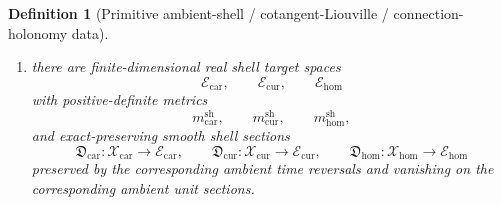 \documentclass[11pt]{article}
\newcommand{\TensorAmbientSpace}{\mathcal X_{\mathrm{car}}}
\newcommand{\CurAmbientSpace}{\mathcal X_{\mathrm{cur}}}
\newcommand{\HomAmbientSpace}{\mathcal X_{\mathrm{hom}}}
\newcommand{\TensorAmbientRead}{\Pi_{\mathrm{car}}^{\mathrm{amb}}}
\newcommand{\CurAmbientRead}{\Pi_{\mathrm{cur}}^{\mathrm{amb}}}
\newcommand{\HomAmbientRead}{\Pi_{\mathrm{hom}}^{\mathrm{amb}}}
\newcommand{\TensorShellTarget}{\mathcal E_{\mathrm{car}}}
\newcommand{\CurShellTarget}{\mathcal E_{\mathrm{cur}}}
\newcommand{\HomShellTarget}{\mathcal E_{\mathrm{hom}}}
\newcommand{\TensorShellMetric}{m_{\mathrm{car}}^{\mathrm{sh}}}
\newcommand{\CurShellMetric}{m_{\mathrm{cur}}^{\mathrm{sh}}}
\newcommand{\HomShellMetric}{m_{\mathrm{hom}}^{\mathrm{sh}}}
\newcommand{\TensorShellSection}{\mathfrak D_{\mathrm{car}}}
\newcommand{\CurShellSection}{\mathfrak D_{\mathrm{cur}}}
\newcommand{\HomShellSection}{\mathfrak D_{\mathrm{hom}}}
\newtheorem{definition}{Definition}
\begin{document}
\begin{definition}[Primitive ambient-shell / cotangent-Liouville / connection-holonomy data]
\begin{enumerate}
    \[
    (\TensorAmbientRead)^{-1}(x),\qquad
    (\CurAmbientRead)^{-1}(y),\qquad
    (\HomAmbientRead)^{-1}(z)
    \]
    is compact.
    \item there are finite-dimensional real shell target spaces
    \[
    \TensorShellTarget,\qquad
    \CurShellTarget,\qquad
    \HomShellTarget
    \]
    with positive-definite metrics
    \[
    \TensorShellMetric,\qquad
    \CurShellMetric,\qquad
    \HomShellMetric,
    \]
    and exact-preserving smooth shell sections
    \[
    \TensorShellSection:\TensorAmbientSpace\to\TensorShellTarget,\qquad
    \CurShellSection:\CurAmbientSpace\to\CurShellTarget,\qquad
    \HomShellSection:\HomAmbientSpace\to\HomShellTarget
    \]
    preserved by the corresponding ambient time reversals and vanishing on the corresponding ambient unit sections.


\end{enumerate}
\end{definition}
\end{document}
